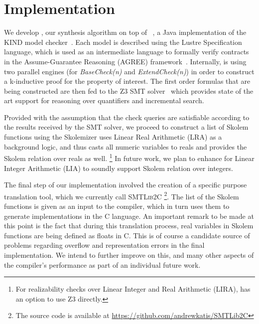 \section{Implementation}
\label{sec:impl}

We develop \jkindsynt, our synthesis algorithm on top of \jkind~\cite{jkind},
a Java implementation of the \textsc{KIND} model
checker~\cite{Hagen08:kind}. Each model is described using the Lustre
Specification language, which is used as an intermediate language to formally verify contracts in the Assume-Guarantee Reasoning (\textsc{AGREE}) framework~\cite{NFM2012:CoGaMiWhLaLu}.
Internally, \jkind is using two parallel engines (for \textit{BaseCheck(n)} and
\textit{ExtendCheck(n)}) in order to construct a k-inductive proof for the
property of interest.
The first order formulas that are being constructed are then fed to the \textsc{Z3} SMT
solver~\cite{DeMoura08:z3} which provides state of the art support for reasoning
over quantifiers and incremental search.

Provided with the assumption that the check queries are satisfiable according to
the results received by the SMT solver, we proceed to construct a list of
Skolem functions using the \aeval Skolemizer%
\aeval  uses Linear Real Arithmetic (LRA) as a background logic, and thus casts all numeric variables to reals and provides the Skolem relation over reals as well.%
\footnote{For realizability checks over Linear Integer and Real
  Arithmetic (LIRA), \jkind has an option to use \textsc{Z3} directly.}
In future work, we plan to enhance  \aeval for Linear Integer Arithmetic (LIA) to soundly support Skolem relation over integers.

The final step of our implementation involved the creation of a specific purpose
translation tool, which we currently call \textsc{SMTLib2C}%
\footnote{The source code
is available at \url{https://github.com/andrewkatis/SMTLib2C}}. The list
of the Skolem functions is given as an input to the compiler, which in turn uses
them to generate implementations in the C language. An important remark to be
made at this point is the fact that during this translation process, real
variables in Skolem functions are being defined as floats in C. This is of
course a candidate source of problems regarding overflow and representation
errors in the final implementation. We intend to further improve on this, and
many other aspects of the compiler's performance as part of an individual
future work.



